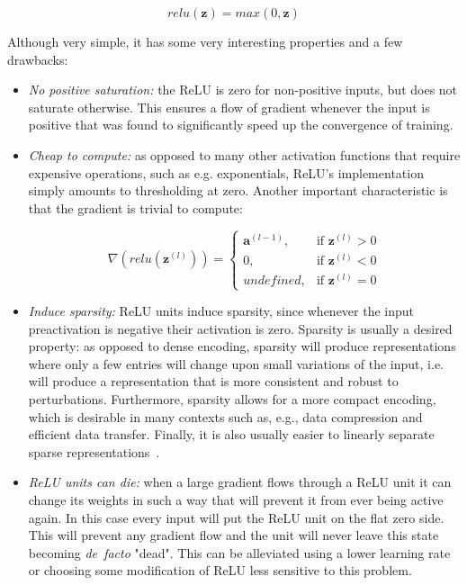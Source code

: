\begin{equation}\label{eq:relu}
    relu(\mathbf{z}) = max(0, \mathbf{z})
\end{equation}

Although very simple, it has some very interesting properties and a few
drawbacks:

\begin{itemize}
    \item \emph{No positive saturation:} the ReLU is zero for non-positive
        inputs, but does not saturate otherwise. This ensures a flow of
        gradient whenever the input is positive that was found to significantly
        speed up the convergence of training.
    \item \emph{Cheap to compute:} as opposed to many other activation
        functions that require expensive operations, such as e.g. exponentials,
        ReLU's implementation simply amounts to thresholding at zero. Another
        important characteristic is that the gradient is trivial to compute:

        \begin{equation}\label{eq:relu_derivative}
            \nabla (relu(\mathbf{z}^{(l)})) =
                \begin{cases}
                    \mathbf{a}^{(l-1)},  & \text{if } \mathbf{z}^{(l)} > 0 \\
                    0,          & \text{if } \mathbf{z}^{(l)} < 0 \\
                    undefined,  & \text{if } \mathbf{z}^{(l)} = 0
                \end{cases}
        \end{equation}

    \item \emph{Induce sparsity:} ReLU units induce sparsity, since whenever
        the input preactivation is negative their activation is zero. Sparsity
        is usually a desired property: as opposed to dense encoding, sparsity
        will produce representations where only a few entries will change
        upon small variations of the input, i.e. will produce a representation
        that is more consistent and robust to perturbations. Furthermore,
        sparsity allows for a more compact encoding, which is desirable in many
        contexts such as, e.g., data compression and efficient data transfer.
        Finally, it is also usually easier to linearly separate sparse
        representations~\citep{Glorot+al-AI-2011-small}.
    \item \emph{ReLU units can die:} when a large gradient flows through a ReLU
        unit it can change its weights in such a way that will prevent it from
        ever being active again. In this case every input will put the ReLU
        unit on the flat zero side. This will prevent any gradient flow and the
        unit will never leave this state becoming \emph{de~facto} "dead". This
        can be alleviated using a lower learning rate or choosing some
        modification of ReLU less sensitive to this problem.
\end{itemize}

